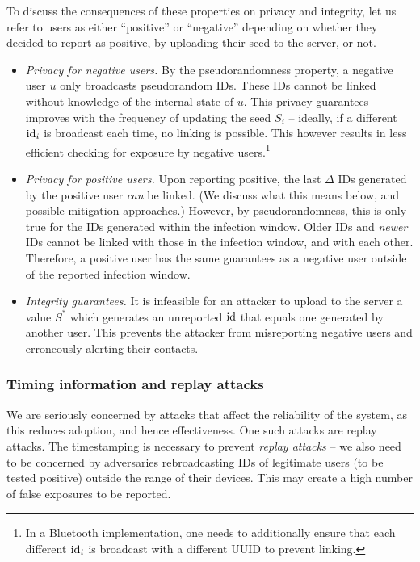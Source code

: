 \documentclass{article}
\begin{document}
To discuss the consequences of these properties on privacy and integrity, let us refer to users as either ``positive'' or ``negative'' depending on whether they decided to report as positive, by uploading their seed to the server, or not. 
\begin{itemize}
    \item {\em Privacy for negative users.}  By the pseudorandomness property, a negative user $u$ only broadcasts pseudorandom IDs. These IDs cannot be linked without knowledge of the internal state of $u$. This privacy guarantees improves with the frequency of updating the seed $S_i$ -- ideally, if a different $\mathrm{id}_i$ is broadcast each time, no linking is possible. This however results in less efficient checking for exposure by negative users.\footnote{In a Bluetooth implementation, one needs to additionally ensure that each different $\mathrm{id}_i$ is broadcast with a different UUID to prevent linking.}
    \item {\em Privacy for positive users.} Upon reporting positive, the last $\Delta$ IDs generated by the positive user {\em can} be linked. (We discuss what this means below, and possible mitigation approaches.) However, by pseudorandomness, this is only true for the IDs generated within the infection window. Older IDs and {\em newer} IDs cannot be linked with those in the infection window, and with each other. Therefore, a positive user has the same guarantees as a negative user outside of the reported infection window.
    \item {\em Integrity guarantees.} It is infeasible for an attacker to upload to the server a value $S^*$ which generates an unreported $\mathrm{id}$ that equals one generated by another user. This prevents the attacker from misreporting negative users and erroneously alerting their contacts.  
\end{itemize}

\subsubsection{Timing information and replay attacks} 

We are seriously concerned by attacks that affect the reliability of the system, as this reduces adoption, and hence effectiveness. One such attacks are replay attacks. The timestamping is necessary to prevent {\em replay attacks} -- we also need to be concerned by adversaries rebroadcasting IDs of legitimate users (to be tested positive) outside the range of their devices. This may create a high number of false exposures to be reported. 
\end{document}
